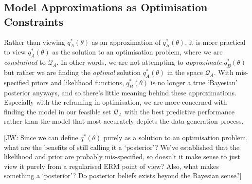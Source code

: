 \documentclass[twoside,11pt]{article}
\newcommand{\jw}[1]{{\color{gray} [JW: #1]}}
\begin{document}
\subsection{Model Approximations as Optimisation Constraints}
Rather than viewing $q_A^*(\theta)$ as an approximation of $q_B^*(\theta)$, it is more practical to view $q_A^*(\theta)$ as the solution to an optimisation problem, where we are \textit{constrained} to $\mathcal{Q}_{A}$. In other words, we are not attempting to \textit{approximate} $q_B^*(\theta)$ but rather we are finding the \textit{optimal} solution $q_A^*(\theta)$ in the space $\mathcal{Q}_{A}$. With mis-specified priors and likelihood functions, $q_B^*(\theta)$  is no longer a true `Bayesian' posterior anyways, and so there's little meaning behind these approximations. Especially with the reframing in optimisation, we are more concerned with finding the model in our feasible set $\mathcal{Q}_{A}$ with the best predictive performance rather than the model that most accurately depicts the data generation process.

\jw{Since we can define $q^*(\theta)$ purely as a solution to an optimisation problem, what are the benefits of still calling it a `posterior'? We've established that the likelihood and prior are probably mis-specified, so doesn't it make sense to just view it purely from a regularised ERM point of view? Also, what makes something a `posterior'? Do posterior beliefs exists beyond the Bayesian sense?}
\end{document}
